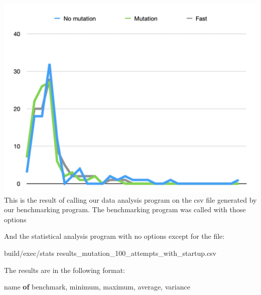 \documentclass[
]{article}
\newenvironment{Shaded}{}{}
\newcommand{\FunctionTok}[1]{\textcolor[rgb]{0.02,0.16,0.49}{#1}}
\newcommand{\KeywordTok}[1]{\textcolor[rgb]{0.00,0.44,0.13}{\textbf{#1}}}
\newcommand{\NormalTok}[1]{#1}
\newcommand{\OperatorTok}[1]{\textcolor[rgb]{0.40,0.40,0.40}{#1}}
\begin{document}
\includegraphics{Screenshot 2020-08-25 at 17.59.43.png} This is the
result of calling our data analysis program on the csv file generated by
our benchmarking program. The benchmarking program was called with those
options

\begin{Shaded}
\end{Shaded}

And the statistical analysis program with no options except for the
file:

\begin{Shaded}
\begin{Highlighting}[]
\NormalTok{build}\OperatorTok{/}\NormalTok{exec}\OperatorTok{/}\NormalTok{stats results\_mutation\_100\_attempts\_with\_startup}\OperatorTok{.}\NormalTok{csv}
\end{Highlighting}
\end{Shaded}

The results are in the following format:

\begin{Shaded}
\begin{Highlighting}[]
\NormalTok{name }\KeywordTok{of}\NormalTok{ benchmark, }\FunctionTok{minimum}\NormalTok{, }\FunctionTok{maximum}\NormalTok{, average, variance}
\end{Highlighting}
\end{Shaded}
\end{document}

